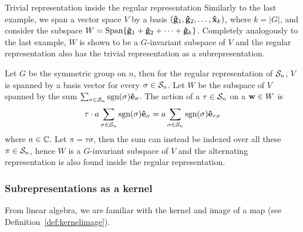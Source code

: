 \begin{example}{Trivial representation inside the regular representation}\cite[Example 1.4.4.]{Sagan}
	Similarly to the last example, we span a vector space $V$ by a basis $(\mathbf{\hat{g}}_1, \mathbf{\hat{g}}_2, \dots, \mathbf{\hat{x}}_{k})$, where $k = |G|$, and consider the subspace $W = \text{Span}\{ \mathbf{\hat{g}}_1 + \mathbf{\hat{g}}_2 + \dots + \mathbf{\hat{g}}_k \}$. Completely analogously to the last example, $W$ is shown to be a $G$-invariant subspace of $V$ and the regular representation also has the trivial representation as a subrepresentation.
\end{example}

\begin{example}\cite[Example 1.4.4.]{Sagan}
	Let $G$ be the symmetric group on $n$, then for the regular representation of $\mathcal{S}_n$, $V$ is spanned by a basis vector for every $\sigma \in \mathcal{S}_n$. Let $W$ be the subspace of $V$ spanned by the sum $\sum_{\sigma \in \mathcal{S}_n} \text{sgn}(\sigma) \mathbf{\hat{e}}_{\sigma}$. The action of a $\tau \in \mathcal{S}_n$ on a $\mathbf{w} \in W$ is
	\begin{align*}
		\tau \cdot a\sum_{\sigma \in \mathcal{S}_n} \text{sgn}(\sigma) \mathbf{\hat{e}}_{\sigma} = a \sum_{\sigma \in \mathcal{S}_n} \text{sgn}(\sigma) \mathbf{\hat{e}}_{\tau\sigma} 
	\end{align*}
	where $a \in \mathbb{C}$. Let $\pi = \tau\sigma$, then the sum can instead be indexed over all these $\pi \in \mathcal{S}_n$, hence $W$ is a $G$-invariant subspace of $V$ and the alternating representation is also found inside the regular representation.
\end{example}

\subsubsection{Subrepresentations as a kernel}

From linear algebra, we are familiar with the kernel and image of a map (see Definition~\ref{def:kernelimage}).

